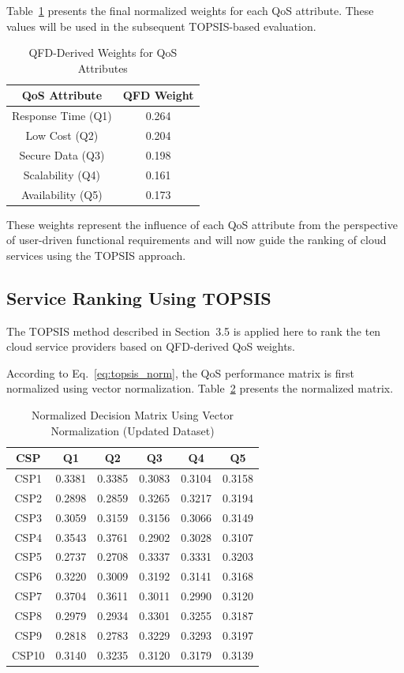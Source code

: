 \documentclass[twocolumn]{svjour3}
\begin{document}
Table~\ref{tab:qfd_weights} presents the final normalized weights for each QoS attribute. These values will be used in the subsequent TOPSIS-based evaluation.

\begin{table}[H]
\centering
\caption{QFD-Derived Weights for QoS Attributes}
\label{tab:qfd_weights}
\begin{tabular}{|c|c|}
\hline
\textbf{QoS Attribute} & \textbf{QFD Weight} \\
\hline
Response Time (Q1)  & 0.264 \\
Low Cost (Q2)       & 0.204 \\
Secure Data (Q3)    & 0.198 \\
Scalability (Q4)    & 0.161 \\
Availability (Q5)   & 0.173 \\
\hline
\end{tabular}
\end{table}

These weights represent the influence of each QoS attribute from the perspective of user-driven functional requirements and will now guide the ranking of cloud services using the TOPSIS approach.


\subsection{Service Ranking Using TOPSIS}

The TOPSIS method described in Section~3.5 is applied here to rank the ten cloud service providers based on QFD-derived QoS weights. 

According to Eq.~\ref{eq:topsis_norm}, the QoS performance matrix is first normalized using vector normalization. Table~\ref{tab:normalized_matrix_updated} presents the normalized matrix.
\begin{table}[H]
\centering
\caption{Normalized Decision Matrix Using Vector Normalization (Updated Dataset)}
\label{tab:normalized_matrix_updated}
\begin{tabular}{|c|c|c|c|c|c|}
\hline
\textbf{CSP} & \textbf{Q1} & \textbf{Q2} & \textbf{Q3} & \textbf{Q4} & \textbf{Q5} \\
\hline
CSP1  & 0.3381 & 0.3385 & 0.3083 & 0.3104 & 0.3158 \\
CSP2  & 0.2898 & 0.2859 & 0.3265 & 0.3217 & 0.3194 \\
CSP3  & 0.3059 & 0.3159 & 0.3156 & 0.3066 & 0.3149 \\
CSP4  & 0.3543 & 0.3761 & 0.2902 & 0.3028 & 0.3107 \\
CSP5  & 0.2737 & 0.2708 & 0.3337 & 0.3331 & 0.3203 \\
CSP6  & 0.3220 & 0.3009 & 0.3192 & 0.3141 & 0.3168 \\
CSP7  & 0.3704 & 0.3611 & 0.3011 & 0.2990 & 0.3120 \\
CSP8  & 0.2979 & 0.2934 & 0.3301 & 0.3255 & 0.3187 \\
CSP9  & 0.2818 & 0.2783 & 0.3229 & 0.3293 & 0.3197 \\
CSP10 & 0.3140 & 0.3235 & 0.3120 & 0.3179 & 0.3139 \\
\hline
\end{tabular}
\end{table}
\end{document}
